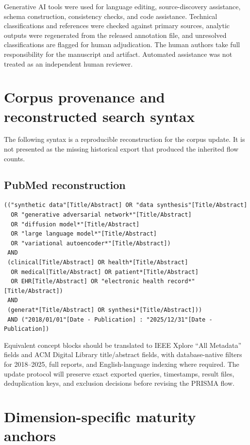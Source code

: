 \documentclass[11pt,letterpaper]{article}
\begin{document}
Generative AI tools were used for language editing, source-discovery assistance, schema construction, consistency checks, and code assistance. Technical classifications and references were checked against primary sources, analytic outputs were regenerated from the released annotation file, and unresolved classifications are flagged for human adjudication. The human authors take full responsibility for the manuscript and artifact. Automated assistance was not treated as an independent human reviewer.

\clearpage
\appendix

\section{Corpus provenance and reconstructed search syntax}
\label{app:search}

The following syntax is a reproducible reconstruction for the corpus update. It is not presented as the missing historical export that produced the inherited flow counts.

\subsection*{PubMed reconstruction}
\begin{verbatim}
(("synthetic data"[Title/Abstract] OR "data synthesis"[Title/Abstract]
  OR "generative adversarial network*"[Title/Abstract]
  OR "diffusion model*"[Title/Abstract]
  OR "large language model*"[Title/Abstract]
  OR "variational autoencoder*"[Title/Abstract])
 AND
 (clinical[Title/Abstract] OR health*[Title/Abstract]
  OR medical[Title/Abstract] OR patient*[Title/Abstract]
  OR EHR[Title/Abstract] OR "electronic health record*"[Title/Abstract])
 AND
 (generat*[Title/Abstract] OR synthesi*[Title/Abstract]))
 AND ("2018/01/01"[Date - Publication] : "2025/12/31"[Date - Publication])
\end{verbatim}

Equivalent concept blocks should be translated to IEEE Xplore ``All Metadata'' fields and ACM Digital Library title/abstract fields, with database-native filters for 2018--2025, full reports, and English-language indexing where required. The update protocol will preserve exact exported queries, timestamps, result files, deduplication keys, and exclusion decisions before revising the PRISMA flow.

\section{Dimension-specific maturity anchors}
\end{document}
